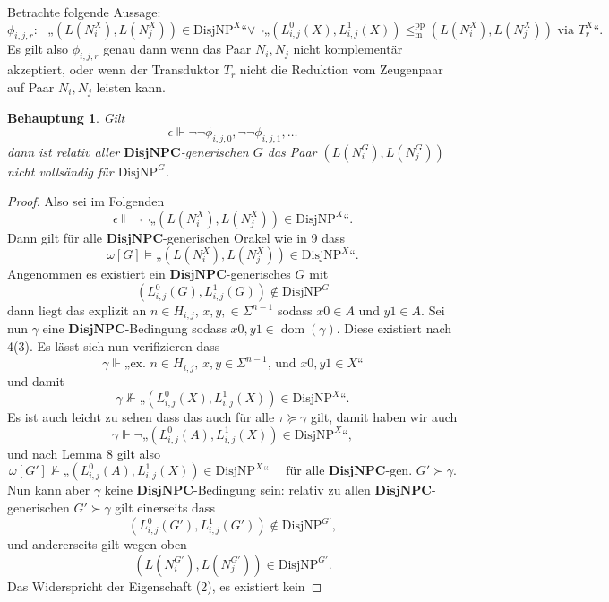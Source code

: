 \documentclass[nofonts]{uebung}
\newtheorem{claim}[theorem]{Behauptung}
\def\DisjNP{\ensuremath{\mathrm{DisjNP}}}
\DeclareMathOperator{\dom}{dom}
\def\leqmpp{\ensuremath{\leq_\mathrm{m}^\mathrm{pp}}}
\begin{document}
Betrachte folgende Aussage:
\[ \phi_{i,j,r}\colon \neg„(L(N_i^X), L(N_j^X))\in\DisjNP^X“ \lor \neg„(L^0_{i,j}(X), L^1_{i,j}(X))\leqmpp(L(N_i^X), L(N_j^X))\text{ via }T^X_r“. \]
Es gilt also $\phi_{i,j,r}$ genau dann wenn das Paar $N_i, N_j$ nicht komplementär akzeptiert, oder wenn der Transduktor $T_r$ nicht die Reduktion vom Zeugenpaar auf Paar $N_i, N_j$ leisten kann.

\begin{claim}
Gilt \[ \epsilon\Vdash \neg\neg\phi_{i,j,0}, \neg\neg\phi_{i,j,1}, \dots \]
dann ist relativ aller $\mathbf{DisjNPC}$-generischen $G$ das Paar $(L(N_i^G), L(N_j^G))$ nicht vollsändig für $\DisjNP^G$. 
\end{claim}
\begin{proof}
    Also sei im Folgenden \[ \epsilon \Vdash\neg\neg„(L(N_i^X), L(N_j^X))\in\DisjNP^X“. \]
    Dann gilt für alle $\mathbf{DisjNPC}$-generischen Orakel wie in 9 dass
    \[ \omega[G] \vDash „(L(N_i^X), L(N_j^X))\in\DisjNP^X“. \]
    Angenommen es existiert ein $\mathbf{DisjNPC}$-generisches $G$  mit
    \[ (L^0_{i,j}(G), L^1_{i,j}(G))\not\in\DisjNP^G \]
    dann liegt das explizit an $n\in H_{i,j}$, $x,y,\in\Sigma^{n-1}$ sodass $x0\in A$ und $y1\in A$.
    Sei nun $\gamma$ eine $\mathbf{DisjNPC}$-Bedingung sodass $x0,y1\in\dom(\gamma)$. Diese existiert nach 4(3).
    Es lässt sich nun verifizieren dass
    \[ \gamma \Vdash „\text{ex. $n\in H_{i,j}$, $x,y\in\Sigma^{n-1}$, und $x0,y1\in X$}“ \]
    und damit 
    \[ \gamma \not\Vdash „(L^0_{i,j}(X), L^1_{i,j}(X))\in\DisjNP^X“. \]
    Es ist auch leicht zu sehen dass das auch für alle $\tau\succeq\gamma$ gilt, damit haben wir auch
    \[ \gamma \Vdash \neg„(L^0_{i,j}(A), L^1_{i,j}(X))\in\DisjNP^X“, \]
    und nach Lemma 8 gilt also 
    \[ \omega[G'] \not\vDash „(L^0_{i,j}(A), L^1_{i,j}(X))\in\DisjNP^X“\quad\text{ für alle $\mathbf{DisjNPC}$-gen. $G'\succ \gamma$.} \]
    Nun kann aber $\gamma$ keine $\mathbf{DisjNPC}$-Bedingung sein:
    relativ zu allen $\mathbf{DisjNPC}$-generischen $G'\succ \gamma$ gilt einerseits dass \[ (L^0_{i,j}(G'), L^1_{i,j}(G'))\not\in\DisjNP^{G'}, \]
    und andererseits gilt wegen oben
    \[ (L(N_i^{G'}), L(N_j^{G'}))\in\DisjNP^{G'}. \]
    Das Widerspricht der Eigenschaft (2), es existiert kein
   



\end{proof}
\end{document}
